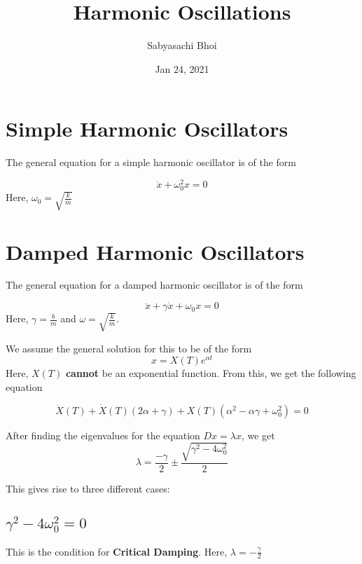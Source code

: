 \documentclass[12pt]{article}
\begin{document}
\title{Harmonic Oscillations}
\author{Sabyasachi Bhoi}
\date{Jan 24, 2021}
\maketitle

\section{Simple Harmonic Oscillators}
The general equation for a simple harmonic oscillator is of the form

\begin{equation*}
	\ddot{x} + \omega_0^2x = 0
\end{equation*}
Here, $\omega_0 = \sqrt{ \frac{k}{m} }$

\section{Damped Harmonic Oscillators}

The general equation for a damped harmonic oscillator is of the form

\begin{equation*}
	\ddot{x} + \gamma \dot{x} + \omega_0 x = 0
\end{equation*}
Here, $\gamma = \frac{b}{m}$ and $\omega = \sqrt{\frac{k}{m}}$.

We assume the general solution for this to be of the form
\begin{equation*}
	x = X(T) e^{\alpha t}
\end{equation*}
Here, $X(T)$ \textbf{cannot} be an exponential function.  
From this, we get the following equation

\begin{equation*}
	\ddot{X}(T) + \dot{X}(T) (2\alpha + \gamma) + X(T) (\alpha^2 - \alpha\gamma + \omega_0^2) = 0
\end{equation*}

After finding the eigenvalues for the equation $Dx = \lambda x$, we get
\begin{equation*}
	\lambda = \frac{-\gamma}{2} \pm \frac{\sqrt{\gamma^2 - 4\omega_0^2}}{2}
\end{equation*}

This gives rise to three different cases:
\subsection{ $\gamma^2 - 4 \omega_0^2 = 0$ }
This is the condition for \textbf{Critical Damping}.
Here, $\lambda = - \frac{\gamma}{2}$
\end{document}
